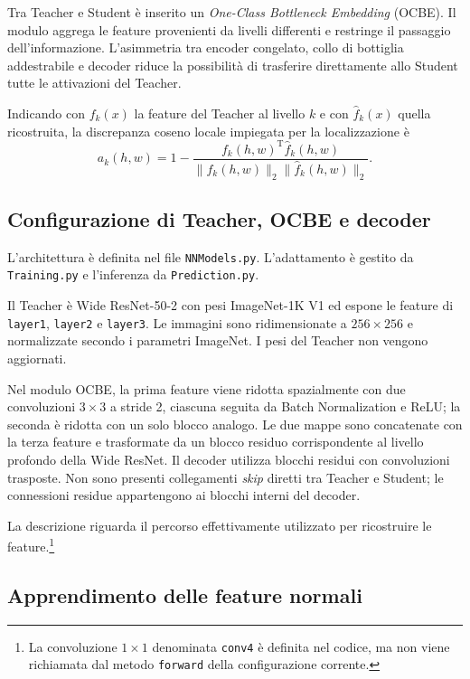 Tra Teacher e Student è inserito un \textit{One-Class Bottleneck Embedding} (OCBE). Il modulo aggrega le feature provenienti da livelli differenti e restringe il passaggio dell'informazione. L'asimmetria tra encoder congelato, collo di bottiglia addestrabile e decoder riduce la possibilità di trasferire direttamente allo Student tutte le attivazioni del Teacher.

Indicando con $f_k(x)$ la feature del Teacher al livello $k$ e con $\widehat{f}_k(x)$ quella ricostruita, la discrepanza coseno locale impiegata per la localizzazione è
\begin{equation}
    a_k(h,w) = 1-
    \frac{f_k(h,w)^{\mathrm{T}}\widehat{f}_k(h,w)}
    {\lVert f_k(h,w)\rVert_2\lVert\widehat{f}_k(h,w)\rVert_2}.
    \label{eq:cap3-rd-cosine}
\end{equation}

\subsection{Configurazione di Teacher, OCBE e decoder}

L'architettura è definita nel file \texttt{NNModels.py}. L'adattamento è gestito da \texttt{Training.py} e l'inferenza da \texttt{Prediction.py}.

Il Teacher è Wide ResNet-50-2 con pesi ImageNet-1K V1 ed espone le feature di \texttt{layer1}, \texttt{layer2} e \texttt{layer3}. Le immagini sono ridimensionate a $256\times256$ e normalizzate secondo i parametri ImageNet. I pesi del Teacher non vengono aggiornati.

Nel modulo OCBE, la prima feature viene ridotta spazialmente con due convoluzioni $3\times3$ a stride 2, ciascuna seguita da Batch Normalization e ReLU; la seconda è ridotta con un solo blocco analogo. Le due mappe sono concatenate con la terza feature e trasformate da un blocco residuo corrispondente al livello profondo della Wide ResNet. Il decoder utilizza blocchi residui con convoluzioni trasposte. Non sono presenti collegamenti \textit{skip} diretti tra Teacher e Student; le connessioni residue appartengono ai blocchi interni del decoder.

La descrizione riguarda il percorso effettivamente utilizzato per ricostruire le feature.\footnote{La convoluzione $1\times1$ denominata \texttt{conv4} è definita nel codice, ma non viene richiamata dal metodo \texttt{forward} della configurazione corrente.}


\subsection{Apprendimento delle feature normali}

